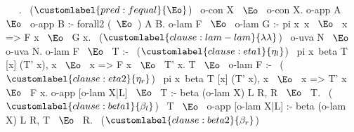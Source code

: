   ~  ~.                              ~($\customlabel{pred:fequal}{\Eo}$)~
  o-con X ~$\Eo$~ o-con X.
  o-app A ~$\Eo$~ o-app B :- forall2 (~$\Eo$~) A B.
  o-lam F ~$\Eo$~ o-lam G :- pi x\ x ~$\Eo$~ x => F x ~$\Eo$~ G x.    ~($\customlabel{clause:lam-lam}{\lambda\lambda}$)~
  o-uva N ~$\Eo$~ o-uva N.
  o-lam F ~$\Eo$~ T :-                                       ~($\customlabel{clause:eta1}{\eta_l}$)~
    pi x\ beta T [x] (T' x), x ~$\Eo$~ x => F x ~$\Eo$~ T' x.
  T ~$\Eo$~ o-lam F :-                                       ~($\customlabel{clause:eta2}{\eta_r}$)~
    pi x\ beta T [x] (T' x), x ~$\Eo$~ x => T' x ~$\Eo$~ F x.
  o-app [o-lam X|L] ~$\Eo$~ T :- beta (o-lam X) L R, R ~$\Eo$~ T. ~($\customlabel{clause:beta1}{\beta_l}$)~
  T ~$\Eo$~ o-app [o-lam X|L] :- beta (o-lam X) L R, T ~$\Eo$~ R. ~($\customlabel{clause:beta2}{\beta_r}$)~
